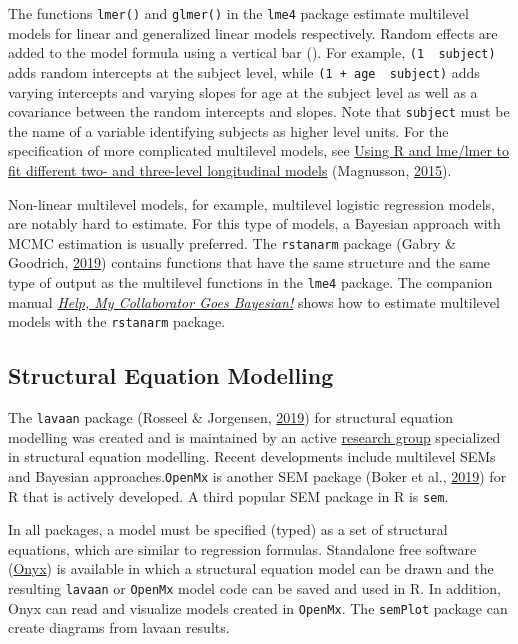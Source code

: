 \documentclass[doc,floatsintext]{apa6}
\begin{document}
The functions \texttt{lmer()} and \texttt{glmer()} in the \texttt{lme4}
package estimate multilevel models for linear and generalized linear
models respectively. Random effects are added to the model formula using
a vertical bar (\texttt{\textbar{}}). For example,
\texttt{(1\ \textbar{}\ subject)} adds random intercepts at the subject
level, while \texttt{(1\ +\ age\ \textbar{}\ subject)} adds varying
intercepts and varying slopes for age at the subject level as well as a
covariance between the random intercepts and slopes. Note that
\texttt{subject} must be the name of a variable identifying subjects as
higher level units. For the specification of more complicated multilevel
models, see
\href{https://rpsychologist.com/r-guide-longitudinal-lme-lmer}{Using R
and lme/lmer to fit different two- and three-level longitudinal models}
(Magnusson, \protect\hyperlink{ref-magnussonUsingLmeLmer2015}{2015}).

Non-linear multilevel models, for example, multilevel logistic
regression models, are notably hard to estimate. For this type of
models, a Bayesian approach with MCMC estimation is usually preferred.
The \texttt{rstanarm} package (Gabry \& Goodrich,
\protect\hyperlink{ref-R-rstanarm}{2019}) contains functions that have
the same structure and the same type of output as the multilevel
functions in the \texttt{lme4} package. The companion manual
\href{https://wdenooy.github.io/Switch2Bayesian/index.html\#32_r_rstanarm_package}{\emph{Help,
My Collaborator Goes Bayesian!}} shows how to estimate multilevel models
with the \texttt{rstanarm} package.

\subsection{Structural Equation Modelling}\label{sem}

The \texttt{lavaan} package (Rosseel \& Jorgensen,
\protect\hyperlink{ref-R-lavaan}{2019}) for structural equation
modelling was created and is maintained by an active
\href{http://lavaan.ugent.be/}{research group} specialized in structural
equation modelling. Recent developments include multilevel SEMs and
Bayesian approaches.\texttt{OpenMx} is another SEM package (Boker et
al., \protect\hyperlink{ref-R-OpenMx}{2019}) for R that is actively
developed. A third popular SEM package in R is \texttt{sem}.

In all packages, a model must be specified (typed) as a set of
structural equations, which are similar to regression formulas.
Standalone free software (\href{http://onyx.brandmaier.de/}{Onyx}) is
available in which a structural equation model can be drawn and the
resulting \texttt{lavaan} or \texttt{OpenMx} model code can be saved and
used in R. In addition, Onyx can read and visualize models created in
\texttt{OpenMx}. The \texttt{semPlot} package can create diagrams from
lavaan results.
\end{document}
